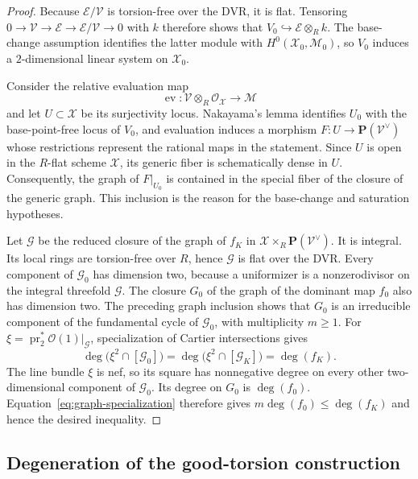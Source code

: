 \documentclass[12pt]{amsart}
\numberwithin{equation}{section}
\theoremstyle{definition}
\theoremstyle{remark}
\newcommand{\PP}{\mathbf P}
\begin{document}
\begin{proof}
Because $\mathscr E/\mathscr V$ is torsion-free over the DVR, it is flat.
Tensoring $0\to\mathscr V\to\mathscr E\to
\mathscr E/\mathscr V\to0$ with $k$ therefore shows that
$V_0\hookrightarrow\mathscr E\otimes_Rk$.  The base-change assumption
identifies the latter module with $H^0(\mathscr X_0,\mathscr M_0)$, so
$V_0$ induces a $2$-dimensional linear system on $\mathscr{X}_0$.

Consider the relative evaluation map
\[
 \operatorname{ev}:\mathscr V\otimes_R\mathcal O_{\mathscr X}
 \longrightarrow\mathscr M
\]
and let $U\subset\mathscr X$ be its surjectivity locus.  Nakayama's
lemma identifies $U_0$ with the base-point-free locus of $V_0$, and
evaluation induces a morphism
$F:U\to\PP(\mathscr V^\vee)$ whose restrictions represent the rational
maps in the statement.  Since $U$ is open in the $R$-flat scheme
$\mathscr X$, its generic fiber is schematically dense in $U$.
Consequently, the graph of $F|_{U_0}$ is contained in the special fiber
of the closure of the generic graph.  This inclusion is the reason for
the base-change and saturation hypotheses.

Let $\mathscr G$ be the reduced closure of the graph of $f_K$ in
$\mathscr X\times_R\PP(\mathscr V^\vee)$.  It is integral.  Its local
rings are torsion-free over $R$, hence $\mathscr G$ is flat over the DVR.
Every component of $\mathscr G_0$ has dimension two, because a
uniformizer is a nonzerodivisor on the integral threefold $\mathscr G$.
The closure $G_0$ of the graph of the dominant map $f_0$ also has
dimension two.  The preceding graph inclusion shows that
$G_0$ is an irreducible component of the fundamental cycle of
$\mathscr G_0$, with multiplicity $m\geq1$.  For
$\xi=\operatorname{pr}_2^*\mathcal O(1)|_{\mathscr G}$, specialization of
Cartier intersections \cite[\S20.3]{Fulton} gives
\begin{equation}
 \deg\bigl(\xi^2\cap[\mathscr G_0]\bigr)
 =\deg\bigl(\xi^2\cap[\mathscr G_K]\bigr)=\deg(f_K).
\label{eq:graph-specialization}
\end{equation}
The line bundle $\xi$ is nef, so its square has nonnegative degree on
every other two-dimensional component of $\mathscr G_0$.  Its degree on
$G_0$ is $\deg(f_0)$.  Equation~\eqref{eq:graph-specialization} therefore
gives $m\deg(f_0)\leq\deg(f_K)$ and hence the desired inequality.
\end{proof}

\subsection{Degeneration of the good-torsion construction}
\end{document}

